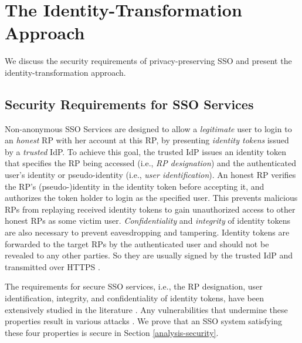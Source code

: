 \section{The Identity-Transformation Approach}
\label{sec:challenge}

We discuss the security requirements of privacy-preserving SSO and present the identity-transformation approach.


\subsection{Security Requirements for SSO Services}
\label{subsec:basicrequirements}

Non-anonymous SSO Services \cite{OpenIDConnect,rfc6749,SAML,SAMLIdentifier,NIST2017draft} are designed to allow a \emph{legitimate} user to login to an \emph{honest} RP with her account at this RP, %
by presenting \emph{identity tokens} issued by a \emph{trusted} IdP.
To achieve this goal, the trusted IdP issues an identity token that specifies the RP being accessed (i.e., \emph{RP designation}) and the authenticated user's identity or pseudo-identity (i.e., \emph{user identification}).
An honest RP verifies the RP's (pseudo-)identity in the identity token before accepting it,
 and authorizes the token holder to login as the specified user. This prevents malicious RPs from replaying received identity tokens to gain unauthorized access to other honest RPs as some victim user.
\emph{Confidentiality} and \emph{integrity} of identity tokens are also necessary to prevent eavesdropping and tampering. Identity tokens are forwarded to the target RPs by the authenticated user and should not be revealed to any other parties. %
So they are usually signed by the trusted IdP and transmitted over HTTPS \cite{OpenIDConnect,rfc6749,SAML}.

The requirements for secure SSO services, i.e., the RP designation, user identification, integrity, and confidentiality of identity tokens, have been extensively studied in the literature \cite{ArmandoCCCT08, FettKS16, FettKS17}.
Any vulnerabilities that undermine these properties result in various attacks \cite{SomorovskyMSKJ12, WangCW12, ArmandoCCCPS13, ZhouE14, WangZLLYLG15, WangZLG16, YangLLZH16, MainkaMS16, MainkaMSW17, YangLCZ18, YangLS17, ShiWL19, ChenPCTKT14, ccsSunB12, DiscoveringJCS, dimvaLiM16, CaoSBKVC14, TowardsShehabM14}.
We prove that an SSO system satisfying these four properties is secure in
Section \ref{analysis-security}.

